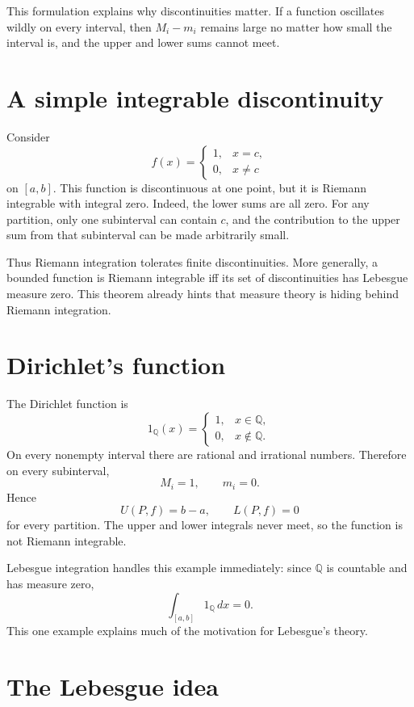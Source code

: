 This formulation explains why discontinuities matter.  If a function oscillates wildly on every interval, then $M_i-m_i$ remains large no matter how small the interval is, and the upper and lower sums cannot meet.

\section{A simple integrable discontinuity}

Consider
\[
  f(x)=\begin{cases}
  1,&x=c,\\
  0,&x\ne c
  \end{cases}
\]
on $[a,b]$.  This function is discontinuous at one point, but it is Riemann integrable with integral zero.  Indeed, the lower sums are all zero.  For any partition, only one subinterval can contain $c$, and the contribution to the upper sum from that subinterval can be made arbitrarily small.

Thus Riemann integration tolerates finite discontinuities.  More generally, a bounded function is Riemann integrable iff its set of discontinuities has Lebesgue measure zero.  This theorem already hints that measure theory is hiding behind Riemann integration.

\section{Dirichlet's function}

The Dirichlet function is
\[
  1_{\mathbb Q}(x)=\begin{cases}
  1,&x\in\mathbb Q,\\
  0,&x\notin\mathbb Q.
  \end{cases}
\]
On every nonempty interval there are rational and irrational numbers.  Therefore on every subinterval,
\[
  M_i=1,
  \qquad
  m_i=0.
\]
Hence
\[
  U(P,f)=b-a,
  \qquad
  L(P,f)=0
\]
for every partition.  The upper and lower integrals never meet, so the function is not Riemann integrable.

Lebesgue integration handles this example immediately: since $\mathbb Q$ is countable and has measure zero,
\[
  \int_{[a,b]}1_{\mathbb Q}\,dx=0.
\]
This one example explains much of the motivation for Lebesgue's theory.

\section{The Lebesgue idea}

